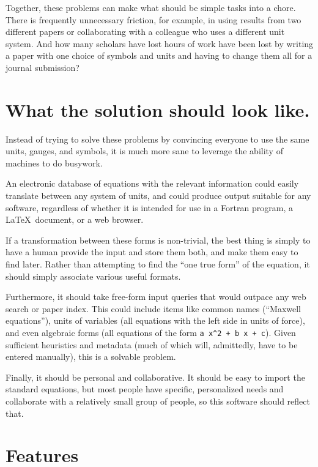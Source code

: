 \documentclass[12pt,letterpaper]{article}
\begin{document}
Together, these problems can make what should be simple tasks into a chore. There is frequently unnecessary friction, for example, in using results from two different papers or collaborating with a colleague who uses a different unit system. And how many scholars have lost hours of work have been lost by writing a paper with one choice of symbols and units and having to change them all for a journal submission?

\section{What the solution should look like.}

Instead of trying to solve these problems by convincing everyone to use the same units, gauges, and symbols, it is much more sane to leverage the ability of machines to do busywork.

An electronic database of equations with the relevant information could easily translate between any system of units, and could produce output suitable for any software, regardless of whether it is intended for use in a Fortran program, a \LaTeX\ document, or a web browser.

If a transformation between these forms is non-trivial, the best thing is simply to have a human provide the input and store them both, and make them easy to find later. Rather than attempting to find the ``one true form'' of the equation, it should simply associate various useful formats.

Furthermore, it should take free-form input queries that would outpace any web search or paper index. This could include items like common names (``Maxwell equations''), units of variables (all equations with the left side in units of force), and even algebraic forms (all equations of the form \verb|a x^2 + b x + c|). Given sufficient heuristics and metadata (much of which will, admittedly, have to be entered manually), this is a solvable problem.

Finally, it should be personal and collaborative. It should be easy to import the standard equations, but most people have specific, personalized needs and collaborate with a relatively small group of people, so this software should reflect that.

\section{Features}

\label{features}
\end{document}

